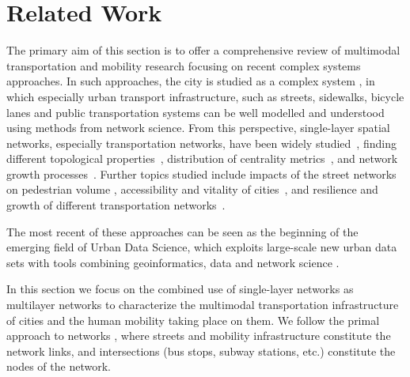 \chapter{Related Work}\label{ch:litReview}

The primary aim of this section is to offer a comprehensive review of multimodal transportation and mobility research focusing on recent complex systems approaches. In such approaches, the city is studied as a complex system \cite{batty2013new,lobo2020urban}, in which especially urban transport infrastructure, such as streets, sidewalks, bicycle lanes and public transportation systems can be well modelled and understood using methods from network science. From this perspective, single-layer spatial networks, especially transportation networks, have been widely studied~\cite{lin2013complex,barthelemy2011spatial,ding2019application}, finding different topological properties~\cite{jiang2004topological,cardillo2006structural,barthelemy2008patterns,batty2008size,barthelemy2011spatial,strano2013comparative,louf2014typology,boeing2020multiscale}, distribution of centrality metrics~\cite{crucitti2008centrality,boeing2018planarity,kirkley2018structural}, and network growth processes~\cite{makse1995growth,strano2012evolution}. Further topics studied include impacts of the street networks on pedestrian volume \cite{hajrasouliha2015connectivity}, accessibility and vitality of cities~\cite{denadai2016death,biazzo2019accesibility,natera2019walkability}, and resilience and growth of different transportation networks~\cite{baggag2018resilience,ferretti2019resilience,natera2020growth}. %

The most recent of these approaches can be seen as the beginning of the emerging field of Urban Data Science, which exploits large-scale new urban data sets with tools combining geoinformatics, data and network science \cite{organizers2019roundtable,resch2019hds}.

In this section we focus on the combined use of single-layer networks as multilayer networks to characterize the multimodal transportation infrastructure of cities and the human mobility taking place on them. We follow the primal approach to networks \cite{porta2006primal}, where streets and mobility infrastructure constitute the network links, and intersections (bus stops, subway stations, etc.) constitute the nodes of the network.

